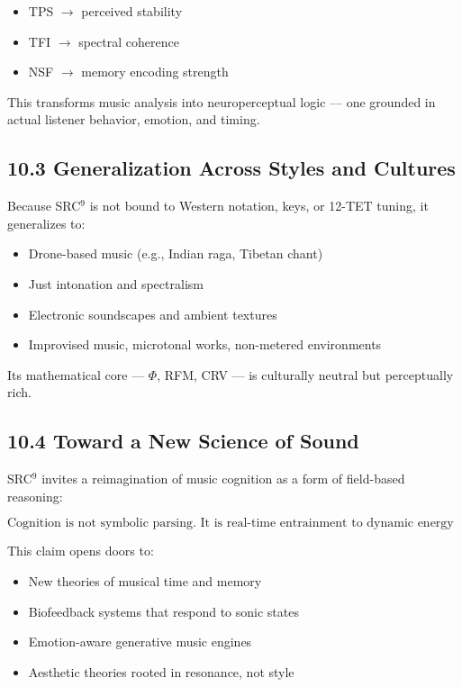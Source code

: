 \documentclass[10pt]{article}
\begin{document}
\begin{itemize}
    \item TPS $\rightarrow$ perceived stability
    \item TFI $\rightarrow$ spectral coherence
    \item NSF $\rightarrow$ memory encoding strength
\end{itemize}

This transforms music analysis into neuroperceptual logic — one grounded in actual listener behavior, emotion, and timing.

\subsection*{10.3 Generalization Across Styles and Cultures}

Because SRC$^{9}$ is not bound to Western notation, keys, or 12-TET tuning, it generalizes to:

\begin{itemize}
    \item Drone-based music (e.g., Indian raga, Tibetan chant)
    \item Just intonation and spectralism
    \item Electronic soundscapes and ambient textures
    \item Improvised music, microtonal works, non-metered environments
\end{itemize}

Its mathematical core — $\Phi$, RFM, CRV — is culturally neutral but perceptually rich.

\subsection*{10.4 Toward a New Science of Sound}

SRC$^{9}$ invites a reimagination of music cognition as a form of field-based reasoning:

\[
\text{Cognition is not symbolic parsing. It is real-time entrainment to dynamic energy structures.}
\]

This claim opens doors to:

\begin{itemize}
    \item New theories of musical time and memory
    \item Biofeedback systems that respond to sonic states
    \item Emotion-aware generative music engines
    \item Aesthetic theories rooted in resonance, not style
\end{itemize}
\end{document}
